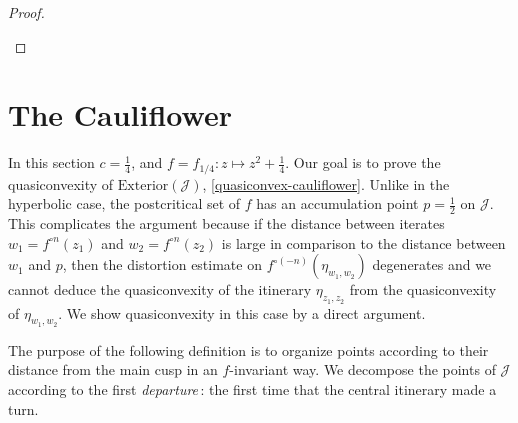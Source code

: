 \begin{proof}
\begin{enumerate}[label=\normalfont(\roman*)]
\begin{comment}
By a distortion estimate
\begin{equation*}
\Length\left(\eta_{z_{0},z_{1}}\right)\asymp\frac{\Length\left(\eta_{w_0,w_1}\right)}{\left|\left(f^{\circ n}\right)'\left(\zeta\right)\right|}
\end{equation*}
 for some point $\zeta \in \mathcal{J}$. The denominator grows
with $n$ exponentially at rate $\theta$, while the numerator has
a bound of the form 
\[
\Length\left(\eta_{w_1,w_2}\right)\lesssim\left|w_1-w_2\right|\lesssim\theta^{n}\left|z_{1}-z_{2}\right|.
\]
Altogether 
\[
\Length\left(\eta_{z_{1},z_{2}}\right)\lesssim\frac{\theta^{n}\left|z_{1}-z_{2}\right|}{\theta^{n}}=\left|z_{1}-z_{2}\right|
\]
 so $\eta_{z_{1},z_{2}}$ is a quasiconvexity certificate.
\end{comment}

\end{enumerate}
\end{proof}

\section{The Cauliflower}
In this section $c=\frac 14$, and $f=f_{1/4}: z\mapsto z^2+ \frac 14$.
Our goal is to prove the quasiconvexity of $\mathrm{Exterior}(\mathcal{J})$, \cref{quasiconvex-cauliflower}.
Unlike in the hyperbolic case, the postcritical set of $f$ has an accumulation point $p=\frac 12$ on $\mathcal J$. This complicates the argument because if the distance between iterates $w_1=f^{\circ n}(z_1)$ and $w_2=f^{\circ n}(z_2)$ is large in comparison to the distance between $w_1$ and $p$, then the distortion estimate on $f^{\circ (-n)}(\eta_{w_1,w_2})$ degenerates and we cannot deduce the quasiconvexity of the itinerary $\eta_{z_1,z_2}$ from the quasiconvexity of $\eta_{w_1,w_2}$. We show quasiconvexity in this case by a direct argument. 


The purpose of the following definition is to organize points according to their distance from the main cusp in an $f$-invariant way. We decompose the points of $\mathcal J$ according to the first \emph{departure}\,: the first time that the central itinerary made a turn.


